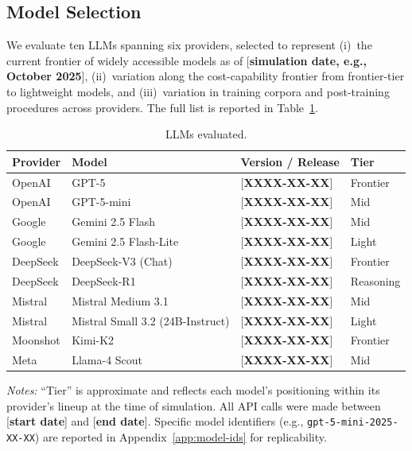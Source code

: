 \documentclass[12pt]{article}
\begin{document}
\subsection{Model Selection}\label{sec:methods-models}

We evaluate ten LLMs spanning six providers, selected to represent (i)~the current frontier of widely accessible models as of [\textbf{simulation date, e.g., October 2025}], (ii)~variation along the cost-capability frontier from frontier-tier to lightweight models, and (iii)~variation in training corpora and post-training procedures across providers. The full list is reported in Table~\ref{tab:models}.

\begin{table}[h]
    \centering
    \caption{LLMs evaluated.}
    \label{tab:models}
    \begin{threeparttable}
    \begin{tabular}{llll}
        \toprule
        Provider & Model & Version / Release & Tier \\
        \midrule
        OpenAI    & GPT-5                     & [\textbf{XXXX-XX-XX}] & Frontier \\
        OpenAI    & GPT-5-mini                & [\textbf{XXXX-XX-XX}] & Mid \\
        Google    & Gemini 2.5 Flash          & [\textbf{XXXX-XX-XX}] & Mid \\
        Google    & Gemini 2.5 Flash-Lite     & [\textbf{XXXX-XX-XX}] & Light \\
        DeepSeek  & DeepSeek-V3 (Chat)        & [\textbf{XXXX-XX-XX}] & Frontier \\
        DeepSeek  & DeepSeek-R1               & [\textbf{XXXX-XX-XX}] & Reasoning \\
        Mistral   & Mistral Medium 3.1        & [\textbf{XXXX-XX-XX}] & Mid \\
        Mistral   & Mistral Small 3.2 (24B-Instruct) & [\textbf{XXXX-XX-XX}] & Light \\
        Moonshot  & Kimi-K2                   & [\textbf{XXXX-XX-XX}] & Frontier \\
        Meta      & Llama-4 Scout             & [\textbf{XXXX-XX-XX}] & Mid \\
        \bottomrule
    \end{tabular}
    \begin{tablenotes}\footnotesize
    \item \textit{Notes:} ``Tier'' is approximate and reflects each model's positioning within its provider's lineup at the time of simulation. All API calls were made between [\textbf{start date}] and [\textbf{end date}]. Specific model identifiers (e.g., \texttt{gpt-5-mini-2025-XX-XX}) are reported in Appendix~\ref{app:model-ids} for replicability.
    \end{tablenotes}
    \end{threeparttable}
\end{table}
\end{document}

